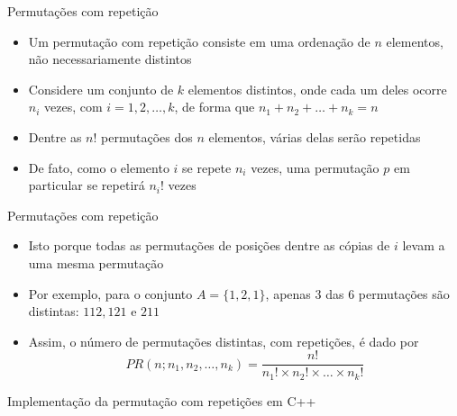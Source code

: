 \begin{frame}[fragile]{Permutações com repetição}

    \begin{itemize}
        \item Um permutação com repetição consiste em uma ordenação de $n$ elementos, não necessariamente distintos

        \item Considere um conjunto de $k$ elementos distintos, onde cada um deles ocorre $n_i$ vezes, com 
            $i = 1, 2, \ldots, k$, de forma que $n_1 + n_2 + \ldots + n_k = n$

        \item Dentre as $n!$ permutações dos $n$ elementos, várias delas serão repetidas

        \item De fato, como o elemento $i$ se repete $n_i$ vezes, uma permutação $p$ em particular se repetirá 
            $n_i!$ vezes
    \end{itemize}

\end{frame}

\begin{frame}[fragile]{Permutações com repetição}

    \begin{itemize}
        \item Isto porque todas as permutações de posições dentre as cópias de $i$ levam a uma mesma permutação

        \item Por exemplo, para o conjunto $A = \{1, 2, 1\}$, apenas $3$ das $6$ permutações são distintas: 
            $112, 121$ e $211$

        \item Assim, o número de permutações distintas, com repetições, é dado por
$$
        PR(n; n_1, n_2, \ldots, n_k) = \frac{n!}{n_1! \times n_2! \times \ldots \times  n_k!}
$$
    \end{itemize}

\end{frame}

\begin{frame}[fragile]{Implementação da permutação com repetições em C++}
\end{frame}

